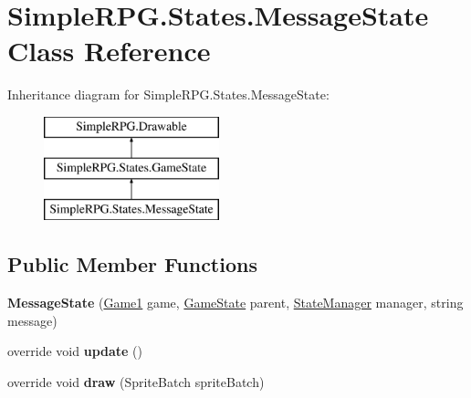 \hypertarget{class_simple_r_p_g_1_1_states_1_1_message_state}{\section{Simple\-R\-P\-G.\-States.\-Message\-State Class Reference}
\label{class_simple_r_p_g_1_1_states_1_1_message_state}
}
Inheritance diagram for Simple\-R\-P\-G.\-States.\-Message\-State\-:\begin{figure}[H]
\begin{center}
\leavevmode
\includegraphics[height=3.000000cm]{class_simple_r_p_g_1_1_states_1_1_message_state}
\end{center}
\end{figure}
\subsection*{Public Member Functions}
\begin{DoxyCompactItemize}
\item 
\hypertarget{class_simple_r_p_g_1_1_states_1_1_message_state_a34cf4aff1d373a0dfb3a3fb663396fab}{{\bfseries Message\-State} (\hyperlink{class_simple_r_p_g_1_1_game1}{Game1} game, \hyperlink{class_simple_r_p_g_1_1_states_1_1_game_state}{Game\-State} parent, \hyperlink{class_simple_r_p_g_1_1_states_1_1_state_manager}{State\-Manager} manager, string message)}\label{class_simple_r_p_g_1_1_states_1_1_message_state_a34cf4aff1d373a0dfb3a3fb663396fab}

\item 
\hypertarget{class_simple_r_p_g_1_1_states_1_1_message_state_a400422f08ad5f53cf408e861695a3648}{override void {\bfseries update} ()}\label{class_simple_r_p_g_1_1_states_1_1_message_state_a400422f08ad5f53cf408e861695a3648}

\item 
\hypertarget{class_simple_r_p_g_1_1_states_1_1_message_state_ae1a03eead4c1e591e8d26c99dff899b9}{override void {\bfseries draw} (Sprite\-Batch sprite\-Batch)}\label{class_simple_r_p_g_1_1_states_1_1_message_state_ae1a03eead4c1e591e8d26c99dff899b9}

\end{DoxyCompactItemize}
